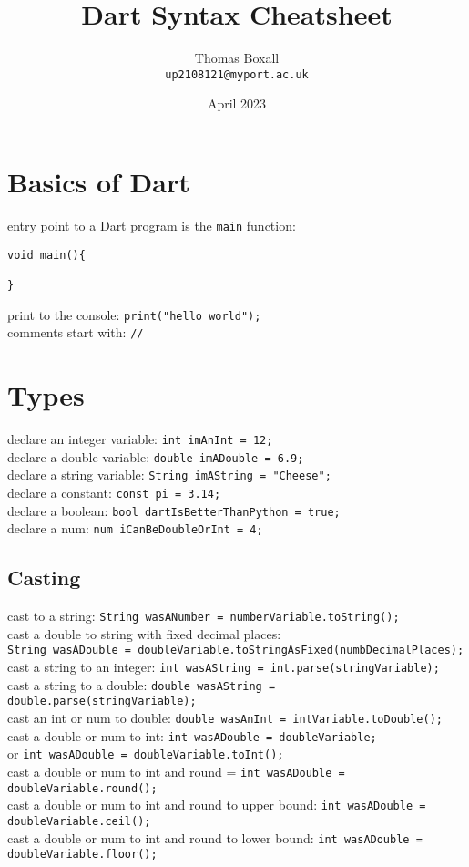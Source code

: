 \documentclass[a4paper,11pt]{article}
\title{Dart Syntax Cheatsheet}
\author{Thomas Boxall\\ \texttt{up2108121@myport.ac.uk}}
\date{April 2023}
\begin{document}
\maketitle
\thispagestyle{fancy}

\section{Basics of Dart}
entry point to a Dart program is the \verb|main| function:
\begin{verbatim}
void main(){

}
\end{verbatim}
print to the console: \verb|print("hello world");|\\
comments start with: \verb|//|

\section{Types}
declare an integer variable: \verb|int imAnInt = 12;|\\
declare a double variable: \verb|double imADouble = 6.9;|\\
declare a string variable: \verb|String imAString = "Cheese";|\\
declare a constant: \verb|const pi = 3.14;|\\
declare a boolean: \verb|bool dartIsBetterThanPython = true;|\\
declare a num: \verb|num iCanBeDoubleOrInt = 4;|
\subsection{Casting}
cast to a string: \verb|String wasANumber = numberVariable.toString();|\\
cast a double to string with fixed decimal places:\\ \verb|String wasADouble = doubleVariable.toStringAsFixed(numbDecimalPlaces);|\\
cast a string to an integer: \verb|int wasAString = int.parse(stringVariable);|\\
cast a string to a double: \verb|double wasAString = double.parse(stringVariable);|\\
cast an int or num to double: \verb|double wasAnInt = intVariable.toDouble();|\\
cast a double or num to int: \verb|int wasADouble = doubleVariable;|\\ or \verb|int wasADouble = doubleVariable.toInt();|\\
cast a double or num to int and round = \verb|int wasADouble = doubleVariable.round();|\\
cast a double or num to int and round to upper bound: \verb|int wasADouble = doubleVariable.ceil();|\\
cast a double or num to int and round to lower bound: \verb|int wasADouble = doubleVariable.floor();|
\end{document}
